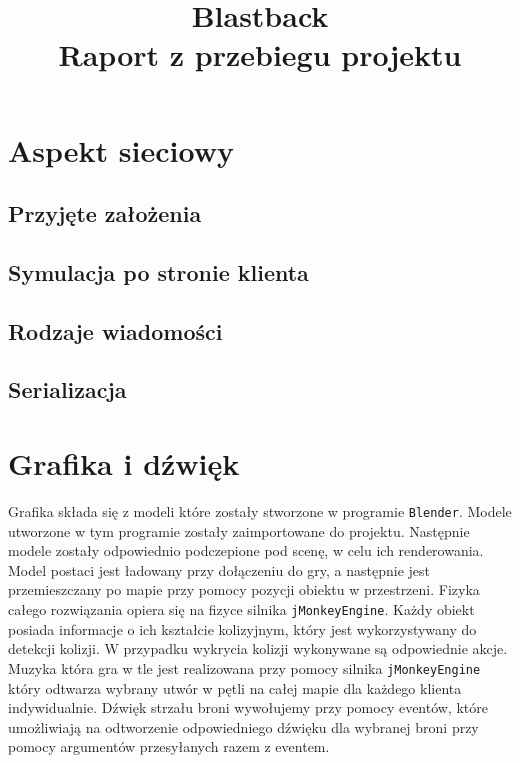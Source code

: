 \documentclass[]{report}
\newcommand{\code}[1]{\colorbox{codegray}{\texttt{#1}}}
\begin{document}
\title{Blastback \\
	\Large Raport z przebiegu projektu}
\maketitle



\chapter*{Aspekt sieciowy}
\section{Przyjęte założenia}
\section{Symulacja po stronie klienta}
\section{Rodzaje wiadomości}
\section{Serializacja}



\chapter*{Grafika i dźwięk}
Grafika składa się z modeli które zostały stworzone w programie \code{Blender}.
Modele utworzone w tym programie zostały zaimportowane do projektu.
Następnie modele zostały odpowiednio podczepione pod scenę, w celu ich renderowania.
Model postaci jest ładowany przy dołączeniu do gry, a następnie jest przemieszczany po mapie przy pomocy pozycji obiektu w przestrzeni.
Fizyka całego rozwiązania opiera się na fizyce silnika \code{jMonkeyEngine}.
Każdy obiekt posiada informacje o ich kształcie kolizyjnym, który jest wykorzystywany do detekcji kolizji.
W przypadku wykrycia kolizji wykonywane są odpowiednie akcje.
Muzyka która gra w tle jest realizowana przy pomocy silnika \code{jMonkeyEngine} który odtwarza wybrany utwór w pętli na całej mapie dla każdego klienta indywidualnie.
Dźwięk strzału broni wywołujemy przy pomocy eventów, które umożliwiają na odtworzenie odpowiedniego dźwięku dla wybranej broni przy pomocy argumentów przesyłanych razem z eventem.
\end{document}
